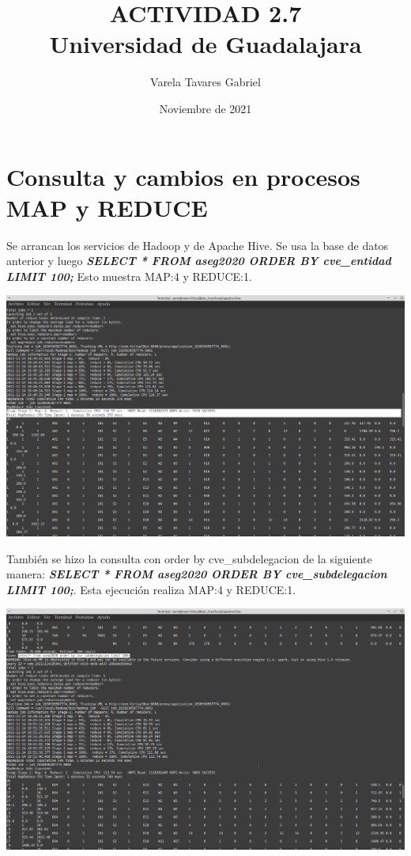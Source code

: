 \documentclass[16pt, spanish]{article}
\begin{document}
\title{{\textbf{ACTIVIDAD 2.7}}\\{\small Universidad de Guadalajara}\\}
\date{\small Noviembre de 2021}
\author{\small Varela Tavares Gabriel}
\maketitle

 

\section*{Consulta y cambios en procesos MAP y REDUCE}

Se arrancan los servicios de Hadoop y de Apache Hive. Se usa la base de datos anterior y luego \textbf{\textit{SELECT * FROM aseg2020 ORDER BY cve\_entidad LIMIT 100;}} Esto muestra MAP:4 y REDUCE:1.

\begin{center}
 \includegraphics[width=0.9\columnwidth]{consulta.png}\\
 \footnotesize{}
\end{center}
\vspace{.5cm}

También se hizo la consulta con order by cve\_subdelegacion de la siguiente manera: \textbf{\textit{SELECT * FROM aseg2020 ORDER BY cve\_subdelegacion LIMIT 100;}}. Esta ejecución realiza MAP:4 y REDUCE:1.

\begin{center}
 \includegraphics[width=0.9\columnwidth]{consulta2.png}\\
 \footnotesize{}
\end{center}
\vspace{.5cm}
\end{document}
